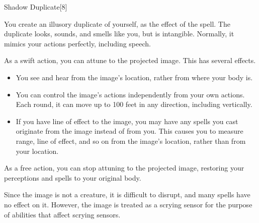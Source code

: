 \begin{spellsection}{Shadow Duplicate}[8]
    \begin{spellheader}
    \end{spellheader}
    \begin{spellcontent}
        \begin{spelltargetinginfo}
            \spellrng{\rngmed}
        \end{spelltargetinginfo}
        \begin{spelleffects}
            \spelleffect You create an illusory duplicate of yourself, as the effect of the  spell. The duplicate looks, sounds, and smells like you, but is intangible. Normally, it mimics your actions perfectly, including speech.
            \par As a swift action, you can attune to the projected image. This has several effects.
            \begin{itemize}
                \item You see and hear from the image's location, rather from where your body is.
                \item You can control the image's actions independently from your own actions. Each round, it can move up to 100 feet in any direction, including vertically.
                \item If you have line of effect to the image, you may have any spells you cast originate from the image instead of from you.
                    This causes you to measure range, line of effect, and so on from the image's location, rather than from your location.
            \end{itemize}

            As a free action, you can stop attuning to the projected image, restoring your perceptions and spells to your original body.

            \spelldur \durlong \dismissable
        \end{spelleffects}
    \end{spellcontent}
    \begin{spellfooter}
        \spellnotes Since the image is not a creature, it is difficult to disrupt, and many spells have no effect on it.
        However, the image is treated as a scrying sensor for the purpose of abilities that affect scrying sensors.
        \miscastexplode
    \end{spellfooter}
\end{spellsection}

